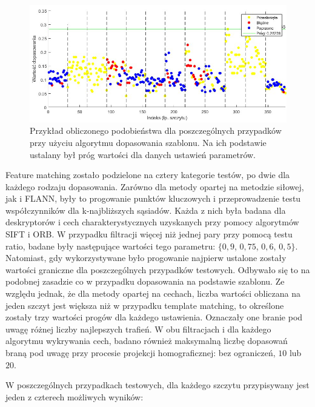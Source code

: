 \begin{figure}[!h]
    \centering \includegraphics[width=1\linewidth]{img/przyklad_threshold.png}
    \caption{Przykład obliczonego podobieństwa dla poszczególnych przypadków przy użyciu algorytmu dopasowania szablonu. Na ich podstawie ustalany był próg wartości dla danych ustawień parametrów.}
    \label{fig:template_threshold}
\end{figure}

Feature matching zostało podzielone na cztery kategorie testów, po dwie dla każdego rodzaju dopasowania. Zarówno dla metody opartej na metodzie siłowej, jak i FLANN, były to progowanie punktów kluczowych i przeprowadzenie testu współczynników dla k-najbliższych sąsiadów. Każda z nich była badana dla  deskryptorów i cech charakterystycznych uzyskanych przy pomocy algorytmów SIFT i ORB. W przypadku filtracji więcej niż jednej pary przy pomocą testu ratio, badane były następujące wartości tego parametru: $\{0,9$, $0,75$, $0,6$, $0,5\}$. Natomiast, gdy wykorzystywane było progowanie najpierw ustalone zostały wartości graniczne dla poszczególnych przypadków testowych. Odbywało się to na podobnej zasadzie co w przypadku dopasowania na podstawie szablonu. Ze względu jednak, że dla metody opartej na cechach, liczba wartości obliczana na jeden szczyt jest większa niż w przypadku template matching, to określone zostały trzy wartości progów dla każdego ustawienia. Oznaczały one branie pod uwagę różnej liczby najlepszych trafień.  W obu filtracjach i dla każdego algorytmu wykrywania cech, badano również maksymalną liczbę dopasowań braną pod uwagę przy procesie projekcji homograficznej: bez ograniczeń, $10$ lub $20$. 

W poszczególnych przypadkach testowych, dla każdego szczytu przypisywany jest jeden z czterech możliwych wyników:

